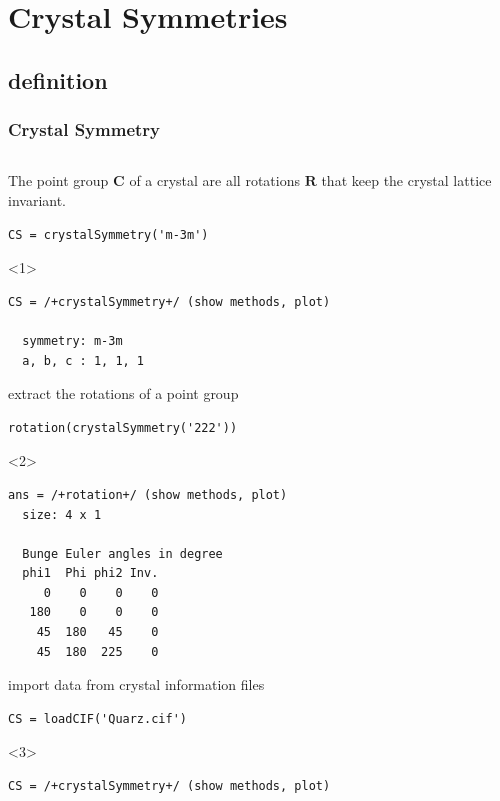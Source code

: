 \documentclass[compress]{beamer}
\begin{document}
\section{Crystal Symmetries}
\label{sec:symmetries}

\subsection*{definition}
\label{sec:crystal-symmetries}

\begin{frame}
  \frametitle{Crystal Symmetry}

  \begin{columns}
  \begin{column}{8cm}

    \begin{overlayarea}{8cm}{8cm}
      The \alert{point group} $\mathbf C$ of a crystal are all rotations
      $\mathbf R$ that keep the crystal lattice invariant.

\begin{lstlisting}[style=input]
CS = crystalSymmetry('m-3m')
\end{lstlisting}
    \begin{onlyenv}<1>
\vspace{-.3cm}\begin{lstlisting}[style=output]
CS = /+crystalSymmetry+/ (show methods, plot)

  symmetry: m-3m
  a, b, c : 1, 1, 1
\end{lstlisting}
    \end{onlyenv}

    \pause \medskip

    extract the rotations of a point group
\begin{lstlisting}[style=input]
rotation(crystalSymmetry('222'))
\end{lstlisting}
    \begin{onlyenv}<2>
\vspace{-.3cm}\begin{lstlisting}[style=output]
ans = /+rotation+/ (show methods, plot)
  size: 4 x 1

  Bunge Euler angles in degree
  phi1  Phi phi2 Inv.
     0    0    0    0
   180    0    0    0
    45  180   45    0
    45  180  225    0
\end{lstlisting}
    \end{onlyenv}

    \pause \medskip

    import data from crystal information files
\begin{lstlisting}[style=input]
CS = loadCIF('Quarz.cif')
\end{lstlisting}
    \begin{onlyenv}<3>
\vspace{-.3cm}\begin{lstlisting}[style=output]
CS = /+crystalSymmetry+/ (show methods, plot)


\end{lstlisting}
\end{onlyenv}
\end{overlayarea}
\end{column}
\end{columns}
\end{frame}
\end{document}
